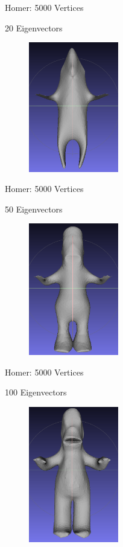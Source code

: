 \documentclass{beamer}
\begin{document}
\begin{frame}{Homer: 5000 Vertices}

20 Eigenvectors
\begin{figure}[t]
    \includegraphics[width=0.35\textwidth]{Harmonics/HomerProjections/Homer20.png}
\end{figure}

\end{frame}

\begin{frame}{Homer: 5000 Vertices}

50 Eigenvectors
\begin{figure}[t]
    \includegraphics[width=0.35\textwidth]{Harmonics/HomerProjections/Homer50.png}
\end{figure}

\end{frame}

\begin{frame}{Homer: 5000 Vertices}

100 Eigenvectors
\begin{figure}[t]
    \includegraphics[width=0.35\textwidth]{Harmonics/HomerProjections/Homer100.png}
\end{figure}

\end{frame}
\end{document}
